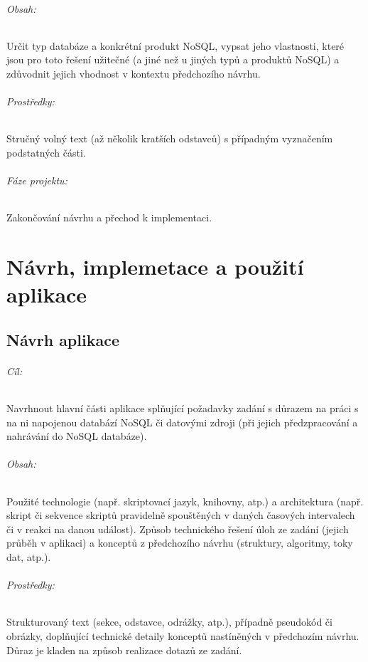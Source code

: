 \documentclass[10pt,xcolor=pdflatex,dvipsnames,table,oneside]{book}
\begin{document}
\paragraph{Obsah:}
Určit typ databáze a konkrétní produkt NoSQL, vypsat jeho vlastnosti,
které jsou pro toto řešení užitečné (a jiné než u jiných typů a produktů NoSQL)
a zdůvodnit jejich vhodnost v kontextu předchozího návrhu.

\paragraph{Prostředky:}
Stručný volný text (až několik kratších odstavců) s případným vyznačením podstatných části.

\paragraph{Fáze projektu:}
Zakončování návrhu a přechod k implementaci.

\part{Návrh, implemetace a použití aplikace}

\chapter{Návrh aplikace}
\iffalse
\paragraph{Cíl:}
Navrhnout hlavní části aplikace splňující požadavky zadání s důrazem na práci s na ni napojenou databází NoSQL či datovými zdroji
(při jejich předzpracování a nahrávání do NoSQL databáze).

\paragraph{Obsah:}
Použité technologie (např. skriptovací jazyk, knihovny, atp.)
a architektura (např. skript či sekvence skriptů pravidelně spouštěných v daných časových intervalech či v reakci na danou událost).
Způsob technického řešení úloh ze zadání (jejich průběh v aplikaci) a konceptů z předchozího návrhu (struktury, algoritmy, toky dat, atp.).

\paragraph{Prostředky:}
Strukturovaný text (sekce, odstavce, odrážky, atp.), případně pseudokód či obrázky, doplňující technické detaily konceptů nastíněných v předchozím návrhu.
Důraz je kladen na způsob realizace dotazů ze zadání.
\end{document}
